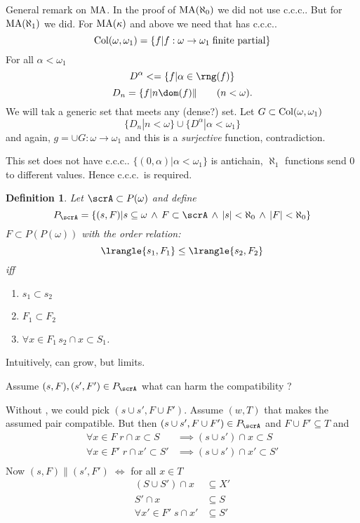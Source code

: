 \documentclass[11pt,pdftex,twoside,a4paper]{article}
\newcommand{\finitepartial}{\textnormal{finite partial}}
\newcommand{\MA}{\ensuremath{\mathop{\rm MA}\nolimits}}
\newcommand{\ccc}{c.c.c.}
\newtheorem{ldef}[thm]{Definition}
\begin{document}
General remark on \MA.
In the proof of \(\MA(\aleph_0)\) we did not use \ccc.
But for \(\MA(\aleph_1)\) we did.
For \(\MA(\kappa)\) and above we need that  has \ccc.
\begin{equation*}
\textnormal{Col}(\omega,\omega_1) 
  = \{f| f: \omega\to\omega_1 \;\finitepartial\}
\end{equation*}
For all \(\alpha< \omega_1\)
\begin{equation*}
D^\alpha< = \{f| \alpha\in\rng(f)\}
\end{equation*}
\begin{equation*}
D_n = \{f| n \dom(f)\| \qquad (n < \omega).
\end{equation*}
We will tak a generic set that meets any (dense?) set.
Let \(G\subset \textnormal{Col}(\omega,\omega_1)\)
\begin{equation*}
\{D_n| n < \omega\} \cup \{D^\alpha| \alpha < \omega_1\}
\end{equation*}
and again, \(g = \cup G: \omega\to\omega_1\)
and this is a \emph{surjective} function, contradiction.

This set does not have \ccc.
\(\{(0,\alpha)| \alpha < \omega_1\}\) is antichain, 
\(\aleph_1\) functions send $0$ to different values. Hence \ccc\ is required.

\begin{ldef}
Let \(\scrA \subset P(\omega)\) and define
\begin{equation*}
P_\scrA = \{(s,F)|  s\subseteq\omega \,\land\, F\subset\scrA 
  \,\land\, |s|<\aleph_0 \,\land\, |F|<\aleph_0\}
\end{equation*}
\(F\subset P(P(\omega))\) with the order relation:
\begin{equation*}
  \lrangle{s_1,F_1} \leq \lrangle{s_2,F_2}
\end{equation*}
iff
\begin{enumerate}
\item \(s_1 \subset s_2\)
\item \(F_1 \subset F_2\)
\item \(\forall x\in F_1\, s_2\cap x \subset S_1\).
\end{enumerate}
\end{ldef}
Intuitively, can grow, but  limits.

Assume \((s,F), (s',F') \in P_\scrA\) what can harm the compatibility ?

Without , we could pick \((s\cup s',F\cup F')\).
Assume \((w,T)\) that makes the assumed pair compatible. But then 
\((s\cup s',F\cup F')\in P_\scrA\) and \(F\cup F' \subseteq T\)
and
\begin{align*}
\forall x\in F\;
r \cap x \subset S   &\implies (s\cup s')\cap x\subset S \\
\forall x\in F'\;
r \cap x' \subset S' &\implies (s\cup s')\cap x'\subset S' \\
\end{align*}
Now \((s,F) \| (s', F') \; \Leftrightarrow\)
for all \(x\in T\) %
\begin{align*}
(S\cup S')\cap x &\subseteq X'\\
S'\cap x &\subseteq S\\
\forall x'\in F'\; s \cap x' &\subseteq S'
\end{align*}
\end{document}
